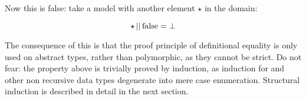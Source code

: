 Now this is false: take a model with another element $\star$ in the
domain:

$$\star \, \mathrm{||} \, \mathrm{false} = \bot$$

The consequence of this is that the proof principle of definitional
equality is only used on abstract types, rather than polymorphic, as
they cannot be strict. Do not fear: the property above is trivially
proved by induction, as induction for  and other non
recursive data types degenerate into mere case enumeration. Structural
induction is described in detail in the next section.


